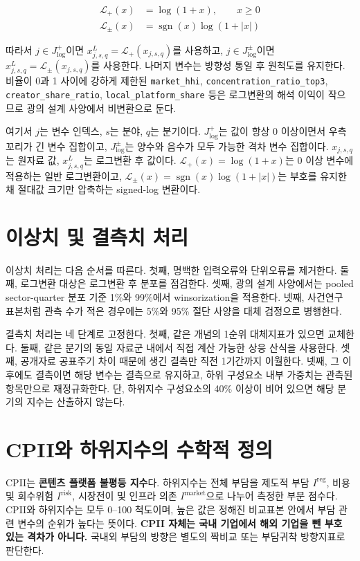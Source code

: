 \documentclass[11pt,a4paper]{report}
\begin{document}
\begin{align}
\mathcal{L}_{+}(x) &= \log(1+x), \qquad x \ge 0 \\
\mathcal{L}_{\pm}(x) &= \operatorname{sgn}(x)\log(1+|x|) \label{eq:cpii_log_transform}
\end{align}

따라서 $j \in J_{\log}^{+}$이면 $x^{L}_{j,s,q}=\mathcal{L}_{+}(x_{j,s,q})$를 사용하고, $j \in J_{\log}^{\pm}$이면 $x^{L}_{j,s,q}=\mathcal{L}_{\pm}(x_{j,s,q})$를 사용한다. 나머지 변수는 방향성 통일 후 원척도를 유지한다. 비율이 0과 1 사이에 강하게 제한된 \texttt{market\_hhi}, \texttt{concentration\_ratio\_top3}, \texttt{creator\_share\_ratio}, \texttt{local\_platform\_share} 등은 로그변환의 해석 이익이 작으므로 광의 설계 사양에서 비변환으로 둔다.

여기서 $j$는 변수 인덱스, $s$는 분야, $q$는 분기이다. $J_{\log}^{+}$는 값이 항상 0 이상이면서 우측 꼬리가 긴 변수 집합이고, $J_{\log}^{\pm}$는 양수와 음수가 모두 가능한 격차 변수 집합이다. $x_{j,s,q}$는 원자료 값, $x^{L}_{j,s,q}$는 로그변환 후 값이다. $\mathcal{L}_{+}(x)=\log(1+x)$는 0 이상 변수에 적용하는 일반 로그변환이고, $\mathcal{L}_{\pm}(x)=\operatorname{sgn}(x)\log(1+|x|)$는 부호를 유지한 채 절대값 크기만 압축하는 signed-log 변환이다.

\section{이상치 및 결측치 처리}
이상치 처리는 다음 순서를 따른다. 첫째, 명백한 입력오류와 단위오류를 제거한다. 둘째, 로그변환 대상은 로그변환 후 분포를 점검한다. 셋째, 광의 설계 사양에서는 pooled sector-quarter 분포 기준 1\%와 99\%에서 winsorization을 적용한다. 넷째, 사건연구 표본처럼 관측 수가 적은 경우에는 5\%와 95\% 절단 사양을 대체 검정으로 병행한다.

결측치 처리는 네 단계로 고정한다. 첫째, 같은 개념의 1순위 대체지표가 있으면 교체한다. 둘째, 같은 분기의 동일 자료군 내에서 직접 계산 가능한 상응 산식을 사용한다. 셋째, 공개자료 공표주기 차이 때문에 생긴 결측만 직전 1기간까지 이월한다. 넷째, 그 이후에도 결측이면 해당 변수는 결측으로 유지하고, 하위 구성요소 내부 가중치는 관측된 항목만으로 재정규화한다. 단, 하위지수 구성요소의 40\% 이상이 비어 있으면 해당 분기의 지수는 산출하지 않는다.

\section{CPII와 하위지수의 수학적 정의}
CPII는 \textbf{콘텐츠 플랫폼 불평등 지수}다. 하위지수는 전체 부담을 제도적 부담 \(I^{\mathrm{reg}}\), 비용 및 회수위험 \(I^{\mathrm{risk}}\), 시장전이 및 인프라 의존 \(I^{\mathrm{market}}\)으로 나누어 측정한 부분 점수다. CPII와 하위지수는 모두 0--100 척도이며, 높은 값은 정해진 비교표본 안에서 부담 관련 변수의 순위가 높다는 뜻이다. \textbf{CPII 자체는 국내 기업에서 해외 기업을 뺀 부호 있는 격차가 아니다.} 국내외 부담의 방향은 별도의 짝비교 또는 부담귀착 방향지표로 판단한다.
\end{document}
